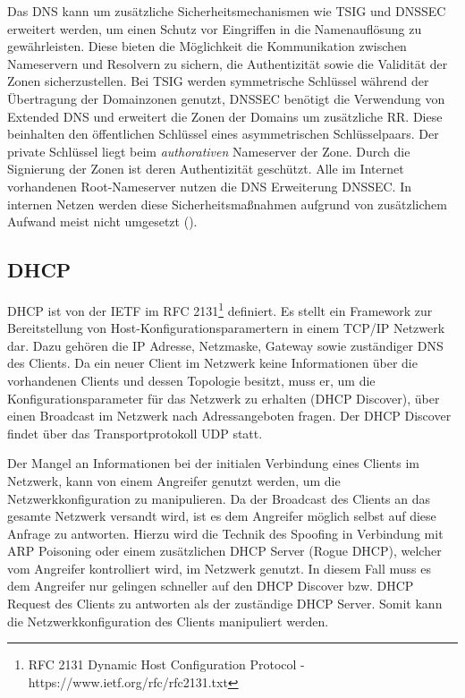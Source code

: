 Das \ac{DNS} kann um zusätzliche Sicherheitsmechanismen wie \ac{TSIG} und \ac{DNSSEC} erweitert werden, um einen Schutz vor Eingriffen in die Namenauflösung zu gewährleisten. Diese bieten die Möglichkeit die Kommunikation zwischen Nameservern und Resolvern zu sichern, die Authentizität sowie die Validität der Zonen sicherzustellen. Bei \ac{TSIG} werden symmetrische Schlüssel während der Übertragung der Domainzonen genutzt, \ac{DNSSEC} benötigt die Verwendung von Extended \ac{DNS} und erweitert die Zonen der Domains um zusätzliche \ac{RR}. Diese beinhalten den öffentlichen Schlüssel eines asymmetrischen Schlüsselpaars. Der private Schlüssel liegt beim \textit{authorativen} Nameserver der Zone. Durch die Signierung der Zonen ist deren Authentizität geschützt. Alle im Internet vorhandenen Root-Nameserver nutzen die \ac{DNS} Erweiterung \ac{DNSSEC}. In internen Netzen werden diese Sicherheitsmaßnahmen aufgrund von zusätzlichem Aufwand meist nicht umgesetzt (\cite{Ledermueller2009}).

\subsection{\ac{DHCP}}
\label{Analyse:DHCP}
\ac{DHCP} ist von der \ac{IETF} im \ac{RFC} 2131\footnote{RFC 2131 Dynamic Host Configuration Protocol - https://www.ietf.org/rfc/rfc2131.txt} definiert. Es stellt ein Framework zur Bereitstellung von Host-Konfigurationsparamertern in einem \ac{TCP}/\ac{IP} Netzwerk dar. Dazu gehören die \ac{IP} Adresse, Netzmaske, Gateway sowie zuständiger \ac{DNS} des Clients. Da ein neuer Client im Netzwerk keine Informationen über die vorhandenen Clients und dessen Topologie besitzt, muss er, um die Konfigurationsparameter für das Netzwerk zu erhalten (\ac{DHCP} Discover), über einen Broadcast im Netzwerk nach Adressangeboten fragen. Der \ac{DHCP} Discover findet über das Transportprotokoll \ac{UDP} statt.

Der Mangel an Informationen bei der initialen Verbindung eines Clients im Netzwerk, kann von einem Angreifer genutzt werden, um die Netzwerkkonfiguration zu manipulieren. Da der Broadcast des Clients an das gesamte Netzwerk versandt wird, ist es dem Angreifer möglich selbst auf diese Anfrage zu antworten. Hierzu wird die Technik des Spoofing in Verbindung mit \ac{ARP} Poisoning oder einem zusätzlichen \ac{DHCP} Server (Rogue \ac{DHCP}), welcher vom Angreifer kontrolliert wird, im Netzwerk genutzt. In diesem Fall muss es dem Angreifer nur gelingen schneller auf den \ac{DHCP} Discover bzw. \ac{DHCP} Request des Clients zu antworten als der zuständige \ac{DHCP} Server. Somit kann die Netzwerkkonfiguration des Clients manipuliert werden.

